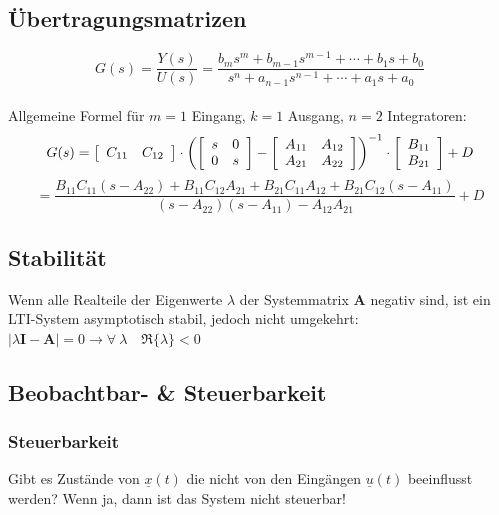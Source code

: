 \subsection{Übertragungsmatrizen}
$$G(s)=\frac{Y(s)}{U(s)}=\frac{b_{m} s^{m} + b_{m-1} s^{m-1} +\cdots+b_{1} s 
+ b_{0}}{s^{n} + a_{n-1} s^{n-1} + \cdots + a_{1} s + a_{0}}$$\\
Allgemeine Formel für $m=1$ Eingang, $k=1$ Ausgang, $n=2$ Integratoren:\\
$$G(s) = \left [ 
\begin{array}{c c}
C_{11}  & C_{12}\\
\end{array}
\right ]\cdot
\left (
\left [ 
\begin{array}{cc}
 s & 0\\
0 & s\\
\end{array}
\right ] -
\left [ 
\begin{array}{cc}
 A_{11} & A_{12}\\
 A_{21} & A_{22}\\
\end{array}
\right ]
\right )^{-1}\cdot
\left [ 
\begin{array}{c}
 B_{11}\\
 B_{21}\\
\end{array}
\right ]+ D$$
$$=  \frac{B_{11}C_{11}(s-A_{22}) + B_{11}C_{12}A_{21} +
B_{21}C_{11}A_{12} + B_{21}C_{12}(s-A_{11})}{(s-A_{22})(s-A_{11}) - A_{12}A_{21}} + D$$


\subsection{Stabilität}
Wenn alle Realteile der Eigenwerte $\lambda$ der Systemmatrix ${\boldsymbol A}$
negativ sind, ist ein LTI-System asymptotisch stabil, jedoch nicht umgekehrt:
$\left | \lambda\boldsymbol{I} - \boldsymbol{A} \right |   =0 \rightarrow \forall~\lambda \quad\Re \{\lambda\}<0$

\subsection{Beobachtbar- \& Steuerbarkeit}
\subsubsection{Steuerbarkeit }
Gibt es Zustände von $\underline{x} (t)$ die nicht von den
Eingängen $\underline{u} (t)$ beeinflusst werden? Wenn ja,
dann ist das System nicht steuerbar!

